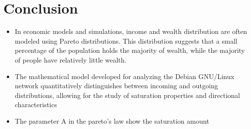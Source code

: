 \documentclass[aps,twocolumn,10pt,reprint]{revtex4}
\begin{document}
\section{Conclusion}

\begin{itemize}
    \item   In economic models and simulations, income and wealth distribution are often modeled using Pareto distributions. This distribution suggests that a small percentage of the population holds the majority of wealth, while the majority of people have relatively little wealth.
\vspace{-5mm}
    \item
    The mathematical model developed for analyzing the Debian GNU/Linux network quantitatively distinguishes between incoming and outgoing distributions, allowing for the study of saturation properties and directional characteristics
    \vspace{-5mm}
    \item The parameter A in the pareto's law show the saturation amount 
\end{itemize}
\end{document}
